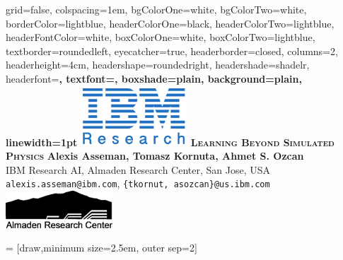 \documentclass[final,paperwidth=36in,paperheight=48in,portrait,fontscale=0.3]{baposter}
\begin{document}
\begin{poster}%
  {
  grid=false,
  colspacing=1em,
  bgColorOne=white,
  bgColorTwo=white,
  borderColor=lightblue,
  headerColorOne=black,
  headerColorTwo=lightblue,
  headerFontColor=white,
  boxColorOne=white,
  boxColorTwo=lightblue,
  textborder=roundedleft,
  eyecatcher=true,
  headerborder=closed,
  columns=2,
  headerheight=4cm,
  headershape=roundedright,
  headershade=shadelr,
  headerfont=\Large\bf\textsc, %
  textfont={\setlength{\parindent}{1.5em}\large},
  boxshade=plain,
  background=plain,
  linewidth=1pt
  } 
  { %
\includegraphics[width=4cm]{../img/ibm_research.png}
  } 
  	{\bf\textsc{Learning Beyond Simulated Physics}\vspace{0.2em}}
  {
	\textbf{Alexis Asseman, Tomasz Kornuta, Ahmet S. Ozcan}\\
	IBM Research AI, Almaden Research Center, San Jose, USA\\
	\texttt{alexis.asseman@ibm.com}, \texttt{\{tkornut, asozcan\}@us.ibm.com}\\
  }
  { %
\includegraphics[width=4cm]{../img/arc_logo.png}
  }


\newcommand{\colouredcircle}{%
\tikz{\useasboundingbox (-0.2em,-0.32em) rectangle(0.2em,0.32em); \draw[draw=black,fill=lightblue,line width=0.03em] (0,0) circle(0.16em);}}
 = [draw,minimum size=2.5em, outer sep=2]




\end{poster}
\end{document}
